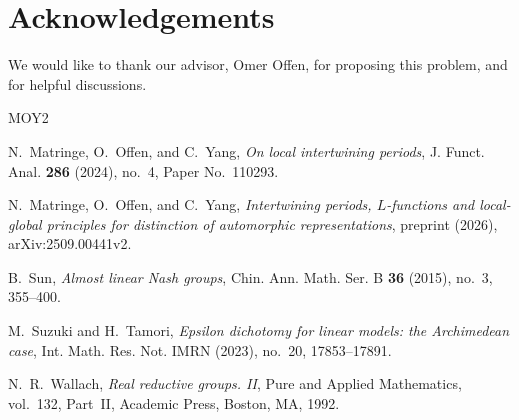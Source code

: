 \documentclass[11pt]{amsart}
\numberwithin{equation}{section}
\begin{document}
\section{Acknowledgements}
We would like to thank our advisor, Omer Offen, for proposing this problem, and for helpful discussions.
\begin{thebibliography}{MOY2}

N.~Matringe, O.~Offen, and C.~Yang,
\emph{On local intertwining periods},
J. Funct. Anal. \textbf{286} (2024), no.~4,
Paper No.~110293.

N.~Matringe, O.~Offen, and C.~Yang,
\emph{Intertwining periods, $L$-functions and local-global
principles for distinction of automorphic representations},
preprint (2026), arXiv:2509.00441v2.

B.~Sun,
\emph{Almost linear Nash groups},
Chin. Ann. Math. Ser. B \textbf{36} (2015), no.~3,
355--400.

M.~Suzuki and H.~Tamori,
\emph{Epsilon dichotomy for linear models: the Archimedean case},
Int. Math. Res. Not. IMRN (2023), no.~20,
17853--17891.

N.~R.~Wallach,
\emph{Real reductive groups. II},
Pure and Applied Mathematics, vol.~132, Part~II,
Academic Press, Boston, MA, 1992.

\end{thebibliography}
\end{document}
